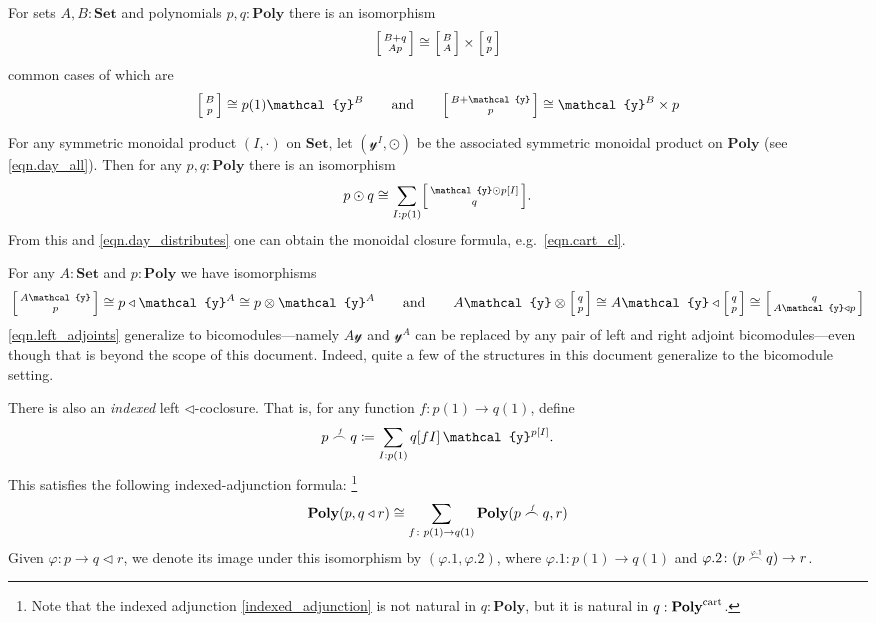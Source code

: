 \documentclass[11pt, one side, article]{memoir}
\makeatletter
\theoremstyle{definition}
\theoremstyle{plain}
\newcommand{\Cat}[1]{\mathbf{#1}}%
\newcommand{\tn}[1]{\textnormal{#1}}
\newcommand{\smset}{\Cat{Set}}
\newcommand{\yon}{{\mathcal{y}}}
\newcommand{\poly}{\Cat{Poly}}
\newcommand{\polycart}{\poly^{\tn{cart}}}
\newcommand{\0}{\textsf{0}}
\newcommand{\1}{\tn{\textsf{1}}}
\newcommand{\tri}{\mathbin{\triangleleft}}
\newcommand{\biglens}[2]{
     \begin{bmatrix}{\vphantom{f_f^f}#2} \\ {\vphantom{f_f^f}#1} \end{bmatrix}
}
\newcommand{\littlelens}[2]{
     \begin{bsmallmatrix}{\vphantom{f}#2} \\ {\vphantom{f}#1} \end{bsmallmatrix}
}
\newcommand{\lens}[2]{
  \relax\if@display
     \biglens{#1}{#2}
  \else
     \littlelens{#1}{#2}
  \fi
}
\newcommand{\indexcoclscale}[1]{\scalebox{.7}{#1}}
\newcommand{\cocl}[1]{
	\scriptsize\overset{\,\indexcoclscale{$#1$}}{\frown}\normalsize
}
\newcommand{\hh}[2][]{#1 \tn{#2} #1}
\newcommand{\qqand}{\hh[\qquad]{and}}
\makeatother
\begin{document}
For sets $A,B:\smset$ and polynomials $p,q:\poly$ there is an isomorphism
\begin{equation}
	\lens{Ap}{B+q}\cong\lens{A}{B}\times\lens{p}{q}
\end{equation}
common cases of which are
\begin{equation}
	\lens{p}{B}\cong p(1)\yon^B
	\qqand
	\lens{p}{B+\yon}\cong\yon^B\times p
\end{equation}

For any symmetric monoidal product $(I,\cdot)$ on $\smset$, let $(\yon^I,\odot)$ be the associated symmetric monoidal product on $\poly$ (see \cref{eqn.day_all}). Then for any $p,q:\poly$ there is an isomorphism
\begin{equation}
	p\odot q\cong\sum_{I:p(1)}\lens{q}{\yon\odot p[I]}.
\end{equation}
From this and \eqref{eqn.day_distributes} one can obtain the monoidal closure formula, e.g.\ \eqref{eqn.cart_cl}.


For any $A:\smset$ and $p:\poly$ we have isomorphisms
\begin{equation}\label{eqn.left_adjoints}
  \lens{p}{A\yon}\cong 
  p\tri\yon^A\cong 
  p\otimes\yon^A
  \qqand
  A\yon\otimes\lens{p}{q}\cong
  A\yon\tri\lens{p}{q}\cong
	\lens{A\yon\tri p}{q}
\end{equation}
\cref{eqn.left_adjoints} generalize to bicomodules---namely $A\yon$ and $\yon^A$ can be replaced by any pair of left and right adjoint bicomodules---even though that is beyond the scope of this document. Indeed, quite a few of the structures in this document generalize to the bicomodule setting.

There is also an \emph{indexed} left $\tri$-coclosure. That is, for any function $f\colon p(1)\to q(1)$, define
\begin{equation}
	p\cocl{f}q\coloneqq \sum_{I: p(1)}q[fI]\,\yon^{p[I]}.
\end{equation}
This satisfies the following indexed-adjunction formula:%
\footnote{Note that the indexed adjunction \eqref{indexed_adjunction} is not natural in $q:\poly$, but it is natural in $q:\polycart$.}
\begin{equation}\label{indexed_adjunction}
	\poly(p,q\tri r)\cong\sum_{f\colon p(1)\to q(1)}\poly(p\cocl{f}q,r)
\end{equation}
Given $\varphi\colon p\to q\tri r$, we denote its image under this isomorphism by $(\varphi.1,\varphi.2)$, where $\varphi.1\colon p(1)\to q(1)$ and $\varphi.2\colon (p\cocl{\varphi.1}q)\to r$.
\end{document}
